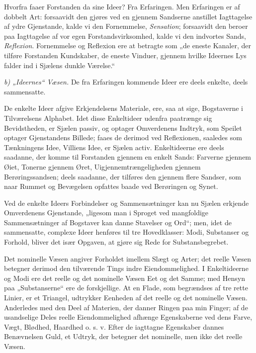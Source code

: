 \documentclass[12pt]{book}
\newcommand{\opage}[1]{\marginnote{\footnotesize\textit{[#1]}}}
\begin{document}
Hvorfra faaer Forstanden da sine Ideer? Fra Erfaringen. Men Erfaringen er af
dobbelt Art: forsaavidt den gjøres ved en gjennem Sandserne anstillet Iagttagelse
af ydre Gjenstande, kalde vi den Fornemmelse, \emph{Sensation}; forsaavidt den
beroer paa Iagttagelse af vor egen Forstandsvirksomhed, kalde vi den indvortes
Sands, \emph{Reflexion}. Fornemmelse og Reflexion ere at betragte som „de eneste
Kanaler, der tilføre Forstanden Kundskaber, de eneste Vinduer, gjennem hvilke
Ideernes Lys falder ind i Sjælens dunkle Værelse.“

\emph{b) „Ideernes“ Væsen.} De fra Erfaringen kommende Ideer ere deels enkelte,
deels sammensatte.

De enkelte Ideer afgive Erkjendelsens Materiale, ere, saa at sige, Bogstaverne i
Tilværelsens Alphabet. Idet disse Enkeltideer udenfra paatrænge sig Bevidstheden,
er Sjælen passiv, og optager Omverdenens Indtryk, som Speilet optager
Gjenstandens Billede; faaes de derimod ved Reflexionen, saaledes som Tænkningens
Idee, Villiens Idee, er Sjælen activ. Enkeltideerne ere deels saadanne, der komme
til Forstanden gjennem en enkelt Sands: Farverne gjennem Øiet, Tonerne gjennem
Øret, Uigjennemtrængeligheden gjennem Berøringssandsen; deels saadanne, der tilføres
den gjennem flere Sandser, som naar Rummet og Bevægelsen opfattes baade ved
Berøringen og Synet.

Ved de enkelte Ideers Forbindelser og Sammensætninger kan nu Sjælen erkjende
Omverdenens Gjenstande, „ligesom man i Sproget ved mangfoldige Sammensætninger af
Bogstaver kan danne Stavelser og Ord“; men, idet de sammensatte, complexe Ideer
henføres til tre Hovedklasser: Modi, Substanser og Forhold, bliver det især
Opgaven, at gjøre sig Rede for Substansbegrebet.

Det nominelle Væsen angiver Forholdet imellem Slægt og Arter; det reelle Væsen
betegner derimod den tilværende
\opage{13} Tings indre Eiendommelighed. I Enkeltideerne og Modi ere det reelle og det
nominelle Væsen Eet og det Samme; med Hensyn paa „Substanserne“ ere de
forskjellige. At en Flade, som begrændses af tre rette Linier, er et Triangel,
udtrykker Eenheden af det reelle og det nominelle Væsen. Anderledes med den Deel af
Materien, der danner Ringen paa min Finger; af de usandselige Deles reelle
Eiendommelighed afhænge Egenskaberne ved dens Farve, Vægt, Blødhed, Haardhed o. s.
v. Efter de iagttagne Egenskaber dannes Benævnelsen Guld, et Udtryk, der betegner
det nominelle, men ikke det reelle Væsen.
\end{document}
